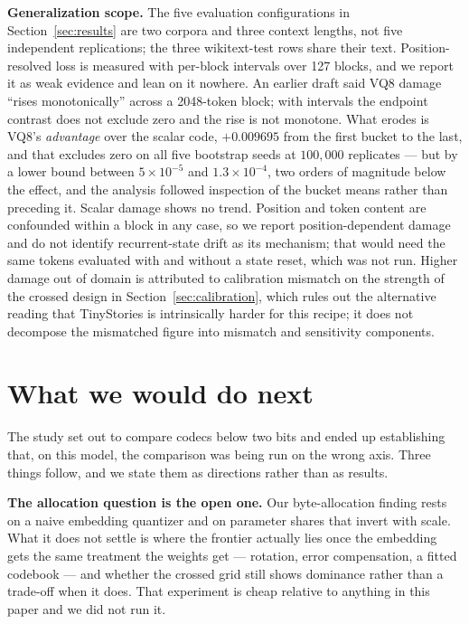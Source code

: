 \documentclass[11pt]{article}
\begin{document}
\textbf{Generalization scope.} The five evaluation configurations in
Section~\ref{sec:results} are two corpora and three context lengths, not five
independent replications; the three wikitext-test rows share their text.
Position-resolved loss is measured with per-block intervals over 127 blocks,
and we report it as weak evidence and lean on it nowhere. An earlier draft said
VQ8 damage ``rises monotonically'' across a 2048-token block; with intervals
the endpoint contrast does not exclude zero and the rise is not monotone. What
erodes is VQ8's \emph{advantage} over the scalar code, $+0.009695$ from the
first bucket to the last, and that excludes zero on all five bootstrap seeds at
$100{,}000$ replicates --- but by a lower bound between $5\times10^{-5}$ and
$1.3\times10^{-4}$, two orders of magnitude below the effect, and the analysis
followed inspection of the bucket means rather than preceding it. Scalar damage
shows no trend. Position and token content are confounded within a block in any
case, so we report position-dependent damage and do not identify
recurrent-state drift as its mechanism; that would need the same tokens
evaluated with and without a state reset, which was not run. Higher damage out of domain is attributed to
calibration mismatch on the strength of the crossed design in
Section~\ref{sec:calibration}, which rules out the alternative reading that
TinyStories is intrinsically harder for this recipe; it does not decompose the
mismatched figure into mismatch and sensitivity components.

\section{What we would do next}

The study set out to compare codecs below two bits and ended up establishing
that, on this model, the comparison was being run on the wrong axis. Three
things follow, and we state them as directions rather than as results.

\textbf{The allocation question is the open one.} Our byte-allocation finding
rests on a naive embedding quantizer and on parameter shares that invert with
scale. What it does not settle is where the frontier actually lies once the
embedding gets the same treatment the weights get --- rotation, error
compensation, a fitted codebook --- and whether the crossed grid still shows
dominance rather than a trade-off when it does. That experiment is cheap
relative to anything in this paper and we did not run it.
\end{document}

